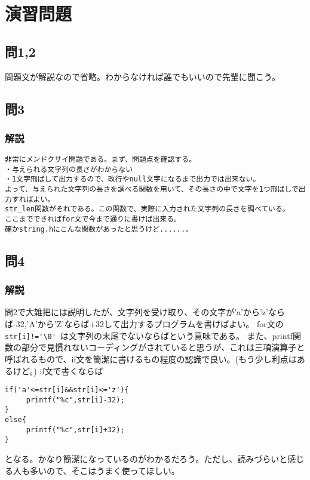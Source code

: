 \section{演習問題}
\subsection{問1,2}
問題文が解説なので省略。わからなければ誰でもいいので先輩に聞こう。
\subsection{問3}

\subsubsection{解説}
\begin{verbatim}
非常にメンドクサイ問題である。まず、問題点を確認する。
・与えられる文字列の長さがわからない
・1文字飛ばして出力するので、改行やnull文字になるまで出力では出来ない。
よって、与えられた文字列の長さを調べる関数を用いて、その長さの中で文字を1つ飛ばしで出力すればよい。
str_len関数がそれである。この関数で、実際に入力された文字列の長さを調べている。
ここまでできればfor文で今まで通りに書けば出来る。
確かstring.hにこんな関数があったと思うけど......。
\end{verbatim}
\subsection{問4}

\subsubsection{解説}
問2で大雑把には説明したが、文字列を受け取り、その文字が'a'から'z'ならば-32,'A'から'Z'ならば+32して出力するプログラムを書けばよい。
for文の\verb| str[i]!='\0' |は文字列の末尾でないならばという意味である。
また、printf関数の部分で見慣れないコーディングがされていると思うが、これは三項演算子と呼ばれるもので、if文を簡潔に書けるもの程度の認識で良い。(もう少し利点はあるけど。)
if文で書くならば
\begin{verbatim}
if('a'<=str[i]&&str[i]<='z'){
     printf("%c",str[i]-32);
}
else{
     printf("%c",str[i]+32);
}
\end{verbatim}
となる。かなり簡潔になっているのがわかるだろう。ただし、読みづらいと感じる人も多いので、そこはうまく使ってほしい。